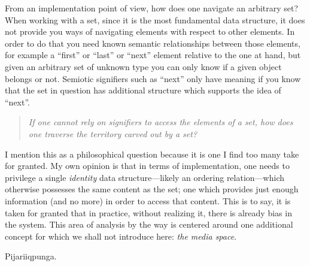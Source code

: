 \documentclass[twoside]{article}
\begin{document}
From an implementation point of view, how does one navigate an arbitrary set? When working with a set, since it is the most
fundamental data structure, it does not provide you ways of navigating elements with respect to other elements. In order to do
that you need known semantic relationships between those elements, for example a ``first'' or ``last'' or ``next'' element
relative to the one at hand, but given an arbitrary set of unknown type you can only know if a given object belongs or not.
Semiotic signifiers such as ``next'' only have meaning if you know that the set in question has additional structure
which supports the idea of ``next''.
\begin{quote}
\emph{If one cannot rely on signifiers to access the elements of a set, how does one traverse the territory carved out by a set?}
\end{quote}
I mention this as a philosophical question because it is one I find too many take for granted. My own opinion is that
in terms of implementation, one needs to privilege a single \emph{identity} data structure---likely an ordering relation---which
otherwise possesses the same content as the set; one which provides just enough information (and no more) in order to access
that content. This is to say, it is taken for granted that in practice, without realizing it, there is already bias in
the system. This area of analysis by the way is centered around one additional concept for which we shall not introduce here:
\emph{the media space}.

Pijariiqpunga.
\end{document}

